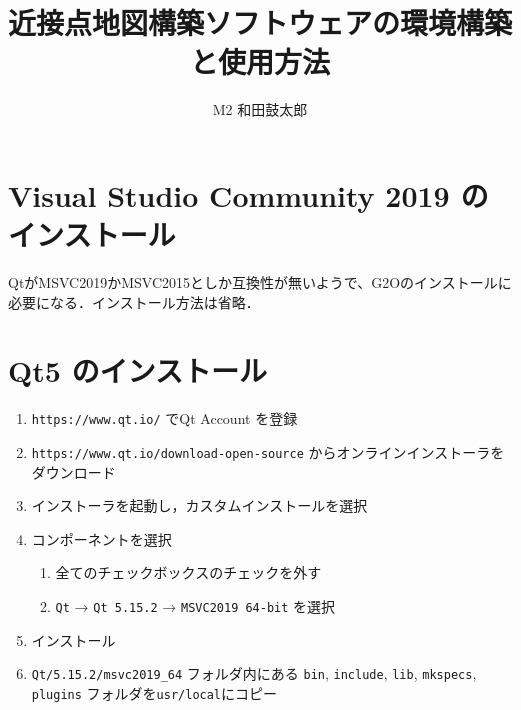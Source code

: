 \documentclass[dvipdfmx]{jsarticle}
\begin{document}

\title{近接点地図構築ソフトウェアの環境構築と使用方法\\[-.25zh]} %

\author{M2 和田鼓太郎} %

\maketitle

\section{Visual Studio Community 2019 のインストール}
QtがMSVC2019かMSVC2015としか互換性が無いようで、G2Oのインストールに必要になる．インストール方法は省略．

\section{Qt5 のインストール}
\begin{enumerate}
	\item \verb|https://www.qt.io/| でQt Account を登録
	\item \verb|https://www.qt.io/download-open-source| からオンラインインストーラをダウンロード
	\item インストーラを起動し，カスタムインストールを選択
	\item コンポーネントを選択
	\begin{enumerate}[i]
		\item 全てのチェックボックスのチェックを外す
		\item \verb|Qt| → \verb|Qt 5.15.2| → \verb|MSVC2019 64-bit| を選択
	\end{enumerate}
	\item インストール
	\item \verb|Qt/5.15.2/msvc2019_64| フォルダ内にある \verb|bin|, \verb|include|, \verb|lib|, \verb|mkspecs|, \verb|plugins| フォルダを\verb|usr/local|にコピー
\end{enumerate}
\end{document}
